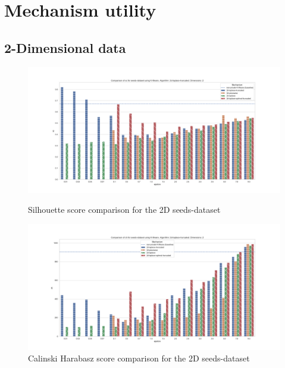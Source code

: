 \section{Mechanism utility}
\subsection{2-Dimensional data}
\begin{figure}[H]
    \centering
    \begin{minipage}[c]{0.8\textwidth}
        \includegraphics[width=1\textwidth]{Results/RQ1/seeds-dataset/sc_seeds-dataset_comparison.png}
        \caption{Silhouette score comparison for the 2D seeds-dataset}
        \label{fig:appendix-sc_seeds-dataset_comparison_2d}
    \end{minipage}
    \begin{minipage}[c]{0.8\textwidth}
        \includegraphics[width=1\textwidth]{Results/RQ1/seeds-dataset/ch_seeds-dataset_comparison.png}
        \caption{Calinski Harabasz score comparison for the 2D seeds-dataset}
        \label{fig:appendix-ch_seeds-dataset_comparison_2d}
    \end{minipage}

\end{figure}
